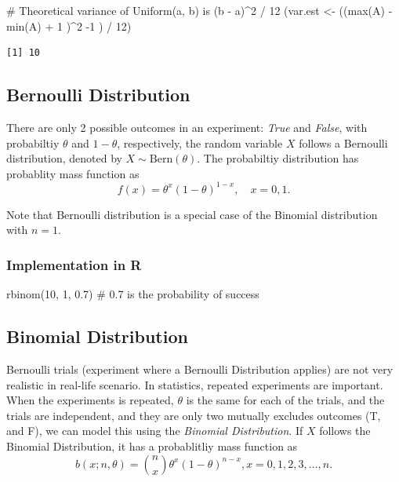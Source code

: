 \documentclass[
  letterpaper,
  DIV=11,
  numbers=noendperiod]{scrreprt}
\newenvironment{Shaded}{\begin{snugshade}}{\end{snugshade}}
\newcommand{\CommentTok}[1]{\textcolor[rgb]{0.37,0.37,0.37}{#1}}
\newcommand{\DecValTok}[1]{\textcolor[rgb]{0.68,0.00,0.00}{#1}}
\newcommand{\FloatTok}[1]{\textcolor[rgb]{0.68,0.00,0.00}{#1}}
\newcommand{\FunctionTok}[1]{\textcolor[rgb]{0.28,0.35,0.67}{#1}}
\newcommand{\NormalTok}[1]{\textcolor[rgb]{0.00,0.23,0.31}{#1}}
\newcommand{\OtherTok}[1]{\textcolor[rgb]{0.00,0.23,0.31}{#1}}
\newcommand{\SpecialCharTok}[1]{\textcolor[rgb]{0.37,0.37,0.37}{#1}}
\begin{document}
\begin{Shaded}
\begin{Highlighting}[]
\CommentTok{\# Theoretical variance of Uniform(a, b) is (b {-} a)\^{}2 / 12}
\NormalTok{(var.est }\OtherTok{\textless{}{-}}\NormalTok{ ((}\FunctionTok{max}\NormalTok{(A) }\SpecialCharTok{{-}} \FunctionTok{min}\NormalTok{(A) }\SpecialCharTok{+} \DecValTok{1}\NormalTok{ )}\SpecialCharTok{\^{}}\DecValTok{2} \SpecialCharTok{{-}}\DecValTok{1}\NormalTok{ ) }\SpecialCharTok{/} \DecValTok{12}\NormalTok{)}
\end{Highlighting}
\end{Shaded}

\begin{verbatim}
[1] 10
\end{verbatim}

\subsection{Bernoulli Distribution}\label{bernoulli-distribution}

There are only 2 possible outcomes in an experiment: \emph{True} and
\emph{False}, with probabiltiy \(\theta\) and \(1-\theta\),
respectively, the random variable \(X\) follows a Bernoulli
distribution, denoted by \(X\sim \text{Bern}(\theta)\). The probabiltiy
distribution has probablity mass function as
\[f(x) = \theta^x (1-\theta)^{1-x},\quad x=0,1.\]

Note that Bernoulli distribution is a special case of the Binomial
distribution with \(n=1\).

\subsubsection{Implementation in R}\label{implementation-in-r-1}

\begin{Shaded}
\begin{Highlighting}[]
\FunctionTok{rbinom}\NormalTok{(}\DecValTok{10}\NormalTok{, }\DecValTok{1}\NormalTok{, }\FloatTok{0.7}\NormalTok{) }\CommentTok{\# 0.7 is the probability of success}
\end{Highlighting}
\end{Shaded}

\subsection{Binomial Distribution}\label{binomial-distribution}

Bernoulli trials (experiment where a Bernoulli Distribution applies) are
not very realistic in real-life scenario. In statistics, repeated
experiments are important. When the experiments is repeated, \(\theta\)
is the same for each of the trials, and the trials are independent, and
they are only two mutually excludes outcomes (T, and F), we can model
this using the \emph{Binomial Distribution}. If \(X\) follows the
Binomial Distribution, it has a probablitliy mass function as
\[b(x ; n, \theta)=\binom{n}{x} \theta^x(1-\theta)^{n-x}, x=0,1,2,3, \ldots, n.\]
\end{document}

